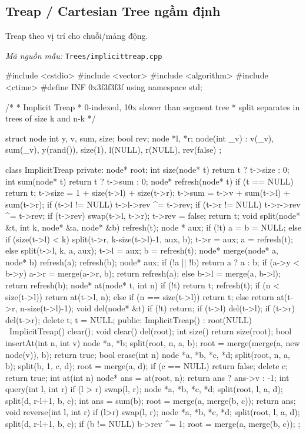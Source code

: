 \documentclass[11pt]{article}
\newcommand{\codepath}[1]{\par\noindent\textit{Mã nguồn mẫu:} \texttt{#1}\par}
\begin{document}
\subsection{Treap / Cartesian Tree ngầm định}

Treap theo vị trí cho chuỗi/mảng động.

\codepath{Trees/implicittreap.cpp}

\begingroup\scriptsize
\begin{vncode}
#include <cstdio>
#include <vector>
#include <algorithm>
#include <ctime>
#define INF 0x3f3f3f3f
using namespace std;

/*
 * Implicit Treap
 * 0-indexed, 10x slower than segment tree
 * split separates in trees of size k and n-k
 */

struct node {
	int y, v, sum, size;
	bool rev;
	node *l, *r;
	node(int _v) : v(_v), sum(_v), y(rand()),
		size(1), l(NULL), r(NULL), rev(false) {}	
};

class ImplicitTreap {
private:
	node* root;
	int size(node* t) { return t ? t->size : 0; }
	int sum(node* t) { return t ? t->sum : 0; }
	node* refresh(node* t) {
		if (t == NULL) return t;
		t->size = 1 + size(t->l) + size(t->r);
		t->sum = t->v + sum(t->l) + sum(t->r);
		if (t->l != NULL) t->l->rev ^= t->rev;
		if (t->r != NULL) t->r->rev ^= t->rev;
		if (t->rev) {
			swap(t->l, t->r);
			t->rev = false;
		}
		return t;
	}
	void split(node* &t, int k, node* &a, node* &b) {
		refresh(t);
		node * aux;
		if (!t) a = b = NULL;
		else if (size(t->l) < k) {
			split(t->r, k-size(t->l)-1, aux, b);
			t->r = aux;
			a = refresh(t);
		}
		else {
			split(t->l, k, a, aux);
			t->l = aux;
			b = refresh(t);
		}
	}
	node* merge(node* a, node* b) {
		refresh(a); refresh(b);
		node* aux;
		if (!a || !b) return a ? a : b;
		if (a->y < b->y) {
			a->r = merge(a->r, b);
			return refresh(a);
		}
		else {
			b->l = merge(a, b->l);
			return refresh(b);
		}
	}
	node* at(node* t, int n) {
		if (!t) return t;
		refresh(t);
		if (n < size(t->l)) return at(t->l, n);
		else if (n == size(t->l)) return t;
		else return at(t->r, n-size(t->l)-1);
	}
	void del(node* &t) {
		if (!t) return;
		if (t->l) del(t->l);
		if (t->r) del(t->r);
		delete t;
		t = NULL;
	}
public:
	ImplicitTreap() : root(NULL) { }
	~ImplicitTreap() { clear(); }
	void clear() { del(root); }
	int size() { return size(root); }
	bool insertAt(int n, int v) {
		node *a, *b;
		split(root, n, a, b);
		root = merge(merge(a, new node(v)), b);
		return true;
	}
	bool erase(int n) {
		node *a, *b, *c, *d;
		split(root, n, a, b);
		split(b, 1, c, d);
		root = merge(a, d);
		if (c == NULL) return false;
		delete c;
		return true;
	}
	int at(int n) {
		node* ans = at(root, n);
		return ans ? ans->v : -1;
	}
	int query(int l, int r) {
		if (l > r) swap(l, r);
		node *a, *b, *c, *d;
		split(root, l, a, d);
		split(d, r-l+1, b, c);
		int ans = sum(b);
		root = merge(a, merge(b, c));
		return ans;
	}
	void reverse(int l, int r) {
		if (l>r) swap(l, r);
		node *a, *b, *c, *d;
		split(root, l, a, d);
		split(d, r-l+1, b, c);
		if (b != NULL) b->rev ^= 1;
		root = merge(a, merge(b, c));
	}
};


\end{vncode}
\end{document}
